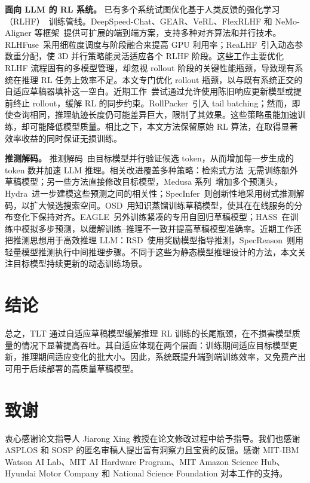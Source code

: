 \documentclass[10pt,twocolumn]{article}
\newcommand{\SysName}{\textrm{TLT}\xspace}
\begin{document}
\noindent\textbf{面向 LLM 的 RL 系统。}
已有多个系统试图优化基于人类反馈的强化学习（RLHF）~\cite{InstructGPT}训练管线。DeepSpeed-Chat、GEAR、VeRL、FlexRLHF 和 NeMo-Aligner 等框架~\cite{DeepSpeedChat,GEAR,HybridFlow,FlexRLHF,NeMoAligner}提供可扩展的端到端方案，支持多种对齐算法和并行技术。RLHFuse~\cite{RLHFuse}采用细粒度调度与阶段融合来提高 GPU 利用率；ReaLHF~\cite{ReaLHF}引入动态参数重分配，使 3D 并行策略能灵活适应各个 RLHF 阶段。这些工作主要优化 RLHF 流程固有的多模型管理，却忽视 rollout 阶段的关键性能瓶颈，导致现有系统在推理 RL 任务上效率不足。本文专门优化 rollout 瓶颈，以与既有系统正交的自适应草稿器填补这一空白。近期工作~\cite{AReaL,StreamRL,zhou2025april}尝试通过允许使用陈旧响应更新模型或提前终止 rollout，缓解 RL 的同步约束。RollPacker~\cite{gao2025rollpacker}引入 tail batching；然而，即使查询相同，推理轨迹长度仍可能差异巨大，限制了其效果。这些策略虽能加速训练，却可能降低模型质量。相比之下，本文方法保留原始 RL 算法，在取得显著效率收益的同时保证无损训练。

\noindent\textbf{推测解码。}
推测解码~\cite{SpeculativeDecoding,chen2023accelerating,AdaServe}由目标模型并行验证候选 token，从而增加每一步生成的 token 数并加速 LLM 推理。相关改进覆盖多种策略：检索式方法~\cite{REST,saxena2023PLD,lookahead}无需训练额外草稿模型；另一些方法直接修改目标模型，Medusa 系列~\cite{Medusa}增加多个预测头，Hydra~\cite{Hydra}进一步建模这些预测之间的相关性；SpecInfer~\cite{SpecInfer}则创新性地采用树式推测解码，以扩大候选搜索空间。OSD~\cite{OSD}用知识蒸馏训练草稿模型，使其在在线服务的分布变化下保持对齐。EAGLE~\cite{Eagle1,Eagle2,Eagle3}另外训练紧凑的专用自回归草稿模型；HASS~\cite{HASS}在训练中模拟多步预测，以缓解训练--推理不一致并提高草稿模型准确率。近期工作还把推测思想用于高效推理 LLM：RSD~\cite{RSD}使用奖励模型指导推测，SpecReason~\cite{SpecReason}则用轻量模型推测执行中间推理步骤。不同于这些为静态模型推理设计的方法，本文关注目标模型持续更新的动态训练场景。

\section{结论}

总之，\SysName 通过自适应草稿模型缓解推理 RL 训练的长尾瓶颈，在不损害模型质量的情况下显著提高吞吐。其自适应体现在两个层面：训练期间适应目标模型更新，推理期间适应变化的批大小。因此，系统既提升端到端训练效率，又免费产出可用于后续部署的高质量草稿模型。

\section*{致谢}
衷心感谢论文指导人 Jiarong Xing 教授在论文修改过程中给予指导。我们也感谢 ASPLOS 和 SOSP 的匿名审稿人提出富有洞察力且宝贵的反馈。感谢 MIT-IBM Watson AI Lab、MIT AI Hardware Program、MIT Amazon Science Hub、Hyundai Motor Company 和 National Science Foundation 对本工作的支持。



\end{document}
